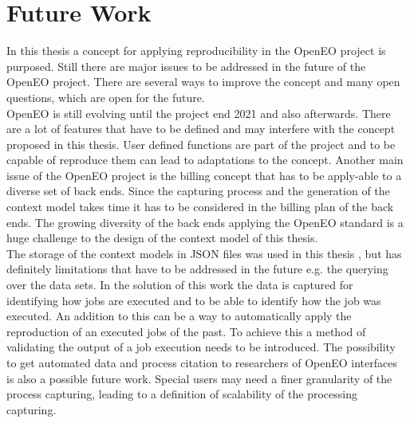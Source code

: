 \documentclass[draft,final]{vutinfth} %
\begin{document}
\section{Future Work}\label{FutureWork}
In this thesis a concept for applying reproducibility in the OpenEO project is purposed. Still there are major issues to be addressed in the future of the OpenEO project. There are several ways to improve the concept and many open questions, which are open for the future. \\
OpenEO is still evolving until the project end 2021 and also afterwards. There are a lot of features that have to be defined and may interfere with the concept proposed in this thesis. User defined functions are part of the project and to be capable of reproduce them can lead to adaptations to the concept. Another main issue of the OpenEO project is the billing concept that has to be apply-able to a diverse set of back ends. Since the capturing process and the generation of the context model takes time it has to be considered in the billing plan of the back ends. The growing diversity of the back ends applying the OpenEO standard is a huge challenge to the design of the context model of this thesis.\\
The storage of the context models in JSON files was used in this thesis , but has definitely limitations that have to be addressed in the future e.g. the querying over the data sets. 
In the solution of this work the data is captured for identifying how jobs are executed and to be able to identify how the job was executed. An addition to this can be a way to automatically apply the reproduction of an executed jobs of the past. To achieve this a method of validating the output of a job execution needs to be introduced. The possibility to get automated data and process citation to researchers of OpenEO interfaces is also a possible future work. Special users may need a finer granularity of the process capturing, leading to a definition of scalability of the processing capturing.      

\backmatter

\listoffigures %

\cleardoublepage %
\listoftables %


\printindex

\printglossaries



\end{document}
